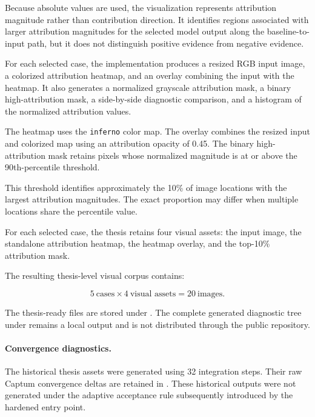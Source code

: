 Because absolute values are used, the visualization represents attribution
magnitude rather than contribution direction. It identifies regions associated
with larger attribution magnitudes for the selected model output along the
baseline-to-input path, but it does not distinguish positive evidence from
negative evidence.

For each selected case, the implementation produces a resized RGB input image,
a colorized attribution heatmap, and an overlay combining the input with the
heatmap. It also generates a normalized grayscale attribution mask, a binary
high-attribution mask, a side-by-side diagnostic comparison, and a histogram of
the normalized attribution values.

The heatmap uses the \texttt{inferno} color map. The overlay combines the
resized input and colorized map using an attribution opacity of 0.45. The
binary high-attribution mask retains pixels whose normalized magnitude is at or
above the 90th-percentile threshold.

This threshold identifies approximately the 10\% of image locations with the
largest attribution magnitudes. The exact proportion may differ when multiple
locations share the percentile value.

For each selected case, the thesis retains four visual assets: the input image,
the standalone attribution heatmap, the heatmap overlay, and the top-10\%
attribution mask.

The resulting thesis-level visual corpus contains:

\begin{equation}
5\ \text{cases}
\times
4\ \text{visual assets}
=
20\ \text{images}.
\end{equation}

The thesis-ready files are stored under
. The complete generated diagnostic tree
under
 remains a local output
and is not distributed through the public repository.

\paragraph{Convergence diagnostics.}

The historical thesis assets were generated using 32 integration steps. Their
raw Captum convergence deltas are retained in
. These
historical outputs were not generated under the adaptive acceptance rule
subsequently introduced by the hardened entry point.

